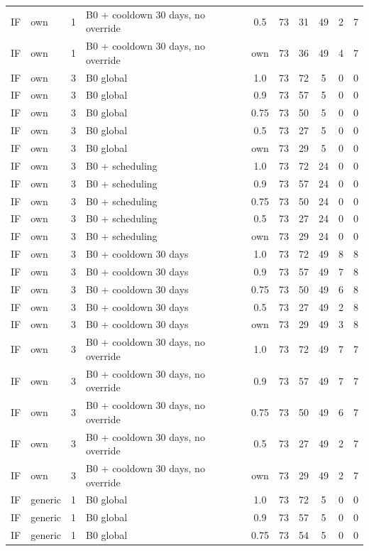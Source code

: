 \documentclass[10pt,onecolumn,letterpaper]{article}
\begin{document}
\begin{longtable}{lllp{4.4cm}cccccc}
IF & own & 1 & B0 + cooldown 30 days, no override & 0.5 & 73 & 31 & 49 & 2 & 7 \\
IF & own & 1 & B0 + cooldown 30 days, no override & own & 73 & 36 & 49 & 4 & 7 \\
IF & own & 3 & B0 global & 1.0 & 73 & 72 & 5 & 0 & 0 \\
IF & own & 3 & B0 global & 0.9 & 73 & 57 & 5 & 0 & 0 \\
IF & own & 3 & B0 global & 0.75 & 73 & 50 & 5 & 0 & 0 \\
IF & own & 3 & B0 global & 0.5 & 73 & 27 & 5 & 0 & 0 \\
IF & own & 3 & B0 global & own & 73 & 29 & 5 & 0 & 0 \\
IF & own & 3 & B0 + scheduling & 1.0 & 73 & 72 & 24 & 0 & 0 \\
IF & own & 3 & B0 + scheduling & 0.9 & 73 & 57 & 24 & 0 & 0 \\
IF & own & 3 & B0 + scheduling & 0.75 & 73 & 50 & 24 & 0 & 0 \\
IF & own & 3 & B0 + scheduling & 0.5 & 73 & 27 & 24 & 0 & 0 \\
IF & own & 3 & B0 + scheduling & own & 73 & 29 & 24 & 0 & 0 \\
IF & own & 3 & B0 + cooldown 30 days & 1.0 & 73 & 72 & 49 & 8 & 8 \\
IF & own & 3 & B0 + cooldown 30 days & 0.9 & 73 & 57 & 49 & 7 & 8 \\
IF & own & 3 & B0 + cooldown 30 days & 0.75 & 73 & 50 & 49 & 6 & 8 \\
IF & own & 3 & B0 + cooldown 30 days & 0.5 & 73 & 27 & 49 & 2 & 8 \\
IF & own & 3 & B0 + cooldown 30 days & own & 73 & 29 & 49 & 3 & 8 \\
IF & own & 3 & B0 + cooldown 30 days, no override & 1.0 & 73 & 72 & 49 & 7 & 7 \\
IF & own & 3 & B0 + cooldown 30 days, no override & 0.9 & 73 & 57 & 49 & 7 & 7 \\
IF & own & 3 & B0 + cooldown 30 days, no override & 0.75 & 73 & 50 & 49 & 6 & 7 \\
IF & own & 3 & B0 + cooldown 30 days, no override & 0.5 & 73 & 27 & 49 & 2 & 7 \\
IF & own & 3 & B0 + cooldown 30 days, no override & own & 73 & 29 & 49 & 2 & 7 \\
IF & generic & 1 & B0 global & 1.0 & 73 & 72 & 5 & 0 & 0 \\
IF & generic & 1 & B0 global & 0.9 & 73 & 57 & 5 & 0 & 0 \\
IF & generic & 1 & B0 global & 0.75 & 73 & 54 & 5 & 0 & 0 \\

\end{longtable}
\end{document}
